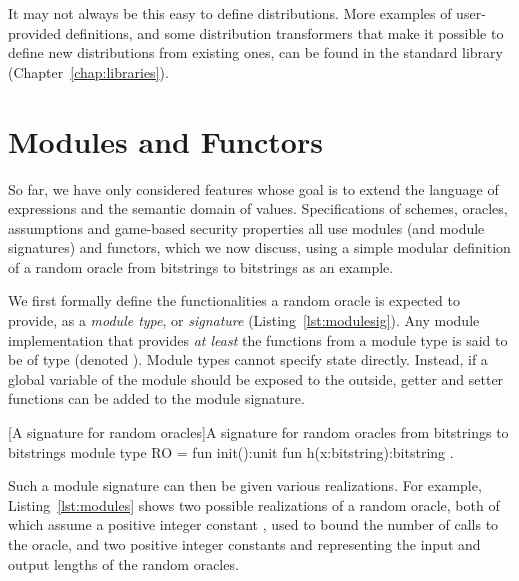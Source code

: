 It may not always be this easy to define distributions. More examples of
user-provided definitions, and some distribution transformers that make it
possible to define new distributions from existing ones, can be found in the
standard library (Chapter~\ref{chap:libraries}).


\section{Modules and Functors\label{sec:modules}}

So far, we have only considered features whose goal is to extend the language of
expressions and the semantic domain of values. Specifications of schemes,
oracles, assumptions and game-based security properties all use modules (and
module signatures) and functors, which we now discuss, using a simple modular
definition of a random oracle from bitstrings to bitstrings as an example.

We first formally define the functionalities a random oracle is expected to
provide, as a \emph{module type}, or \emph{signature}
(Listing~\ref{lst:modulesig}). Any module implementation  that provides
\emph{at least} the functions from a module type  is said to be of
type  (denoted ). Module types cannot specify state
directly. Instead, if a global variable of the module should be exposed to the
outside, getter and setter functions can be added to the module signature.

\begin{easycrypt}[label={lst:modulesig}]{[A signature for random oracles]A signature for random oracles from bitstrings to bitstrings}
module type RO = {
  fun init():unit
  fun h(x:bitstring):bitstring }.
\end{easycrypt}

Such a module signature can then be given various realizations. For example, Listing~\ref{lst:modules} shows two possible realizations of a random oracle, both of which assume a positive integer constant , used to bound the number of calls to the oracle, and two positive integer constants  and  representing the input and output lengths of the random oracles.

